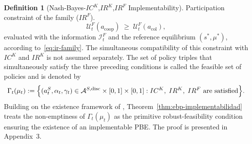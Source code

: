 \documentclass[review,authoryear,12pt]{elsarticle}
\theoremstyle{plain}
\theoremstyle{definition}
\newtheorem{definition}[theorem]{Definition}
\newcommand{\1}{\mathbf{1}}
\begin{document}
\begin{definition}[Nash-Bayes-$IC^K$,$IR^K$,$IR^F$ Implementability]
\smallskip
\noindent Participation constraint of the family \textup{(}$IR^F$\textup{)}.
\[
\mathcal{U}^F_t(a_{\mathrm{coop}})\;\ge\;\mathcal{U}^F_t(a_{\mathrm{col}}),
\]
evaluated with the information $\mathcal{I}_t^F$ and the reference equilibrium $(s^\ast,\mu^\ast)$, according to~\eqref{eq:ir-family}.
The simultaneous compatibility of this constraint with $IC^K$ and $IR^K$ is not assumed separately. The set of policy triples that simultaneously satisfy the three preceding conditions is called the feasible set of policies and is denoted by
\begin{equation}
\label{eq:gamma-factible}
\Gamma_t(\mu_t)
:=\Bigl\{(a_t^S,\alpha_t,\gamma_t)\in
\mathcal{A}^{S,\mathrm{disc}}\times[0,1]\times[0,1] :
IC^K,\;IR^K,\;IR^F
\text{ are satisfied}\Bigr\}.
\end{equation}
Building on the existence framework of \citet{KadanRenySwinkels2017}, Theorem~\ref{thm:ebp-implementabilidad} treats the non-emptiness of $\Gamma_t(\mu_t)$ as the primitive robust-feasibility condition ensuring the existence of an implementable PBE. The proof is presented in Appendix~3.
\end{definition}
\end{document}
